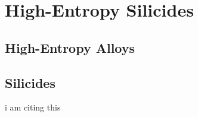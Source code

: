 
\chapter{High-Entropy Silicides}
\label{sec:lab}


\section{High-Entropy Alloys}
\section{Silicides}
i am citing this \cite[95]{AM69}

